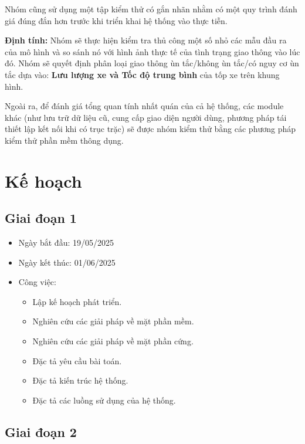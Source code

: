 \quad Nhóm cũng sử dụng một tập kiểm thử có gắn nhãn nhằm có một quy trình đánh giá đúng đắn hơn trước khi triển khai hệ thống vào thực tiễn.

\quad \textbf{Định tính:} Nhóm sẽ thực hiện kiểm tra thủ công một số nhỏ các mẫu đầu ra của mô hình và so sánh nó với hình ảnh thực tế của tình trạng giao thông vào lúc đó. Nhóm sẽ quyết định phân loại giao thông ùn tắc/không ùn tắc/có nguy cơ ùn tắc dựa vào: \textbf{Lưu lượng xe và Tốc độ trung bình} của tốp xe trên khung hình.

\quad Ngoài ra, để đánh giá tổng quan tính nhất quán của cả hệ thống, các module khác (như lưu trữ dữ liệu cũ, cung cấp giao diện người dùng, phương pháp tái thiết lập kết nối khi có trục trặc) sẽ được nhóm kiểm thử bằng các phương pháp kiểm thử phần mềm thông dụng.

\section{Kế hoạch}
\subsection{Giai đoạn 1}
\begin{itemize}
    \item Ngày bắt đầu: 19/05/2025
    \item Ngày kết thúc: 01/06/2025
    \item Công việc:
    \begin{itemize}
        \item Lập kế hoạch phát triển.
        \item Nghiên cứu các giải pháp về mặt phần mềm.
        \item Nghiên cứu các giải pháp về mặt phần cứng.
        \item Đặc tả yêu cầu bài toán.
        \item Đặc tả kiến trúc hệ thống.
        \item Đặc tả các luồng sử dụng của hệ thống.
    \end{itemize}
\end{itemize}

\subsection{Giai đoạn 2}

